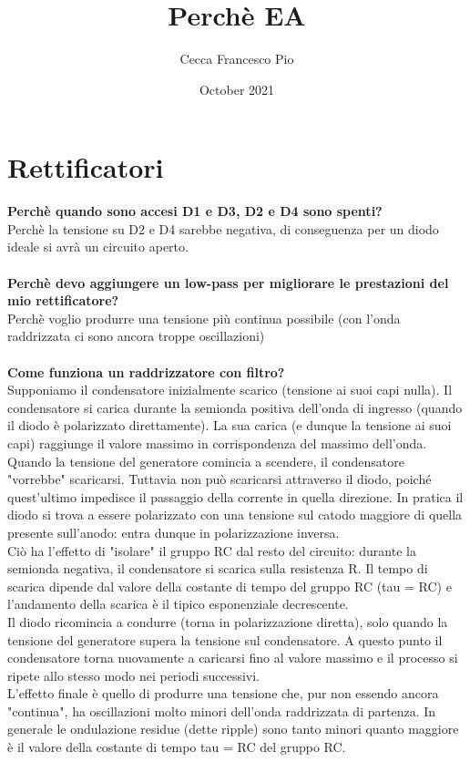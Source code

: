 \documentclass{article}
\title{Perchè EA}
\author{Cecca Francesco Pio}
\date{October 2021}
\begin{document}
\maketitle

\section{Rettificatori}

\textbf{Perchè quando sono accesi D1 e D3, D2 e D4 sono spenti? } \\
Perchè la tensione su D2 e D4 sarebbe negativa, di conseguenza per un diodo ideale si avrà un circuito aperto. \\ \\
\textbf{Perchè devo aggiungere un low-pass per migliorare le prestazioni del mio rettificatore?} \\
Perchè voglio produrre una tensione più continua possibile (con l'onda raddrizzata ci sono ancora troppe oscillazioni) \\ \\
\textbf{Come funziona un raddrizzatore con filtro?} \\
Supponiamo il condensatore inizialmente scarico (tensione ai suoi capi nulla). Il condensatore si carica durante la semionda positiva dell'onda di ingresso (quando il diodo è polarizzato direttamente). La sua carica (e dunque la tensione ai suoi capi) raggiunge il valore massimo in corrispondenza del massimo dell'onda. \\
Quando la tensione del generatore comincia a scendere, il condensatore "vorrebbe" scaricarsi. Tuttavia non può scaricarsi attraverso il diodo, poiché quest'ultimo impedisce il passaggio della corrente in quella direzione. In pratica il diodo si trova a essere polarizzato con una tensione sul catodo maggiore di quella presente sull'anodo: entra dunque in polarizzazione inversa. \\
Ciò ha l'effetto di "isolare" il gruppo RC dal resto del circuito: durante la semionda negativa, il condensatore si scarica sulla resistenza R. Il tempo di scarica dipende dal valore della costante di tempo del gruppo RC (tau = RC) e l'andamento della scarica è il tipico esponenziale decrescente. \\
Il diodo ricomincia a condurre (torna in polarizzazione diretta), solo quando la tensione del generatore supera la tensione sul condensatore. A questo punto il condensatore torna nuovamente a caricarsi fino al valore massimo e il processo si ripete allo stesso modo nei periodi successivi. \\
L'effetto finale è quello di produrre una tensione che, pur non essendo ancora "continua", ha oscillazioni molto minori dell'onda raddrizzata di partenza. In generale le ondulazione residue (dette ripple) sono tanto minori quanto maggiore è il valore della costante di tempo tau = RC del gruppo RC.
\end{document}
